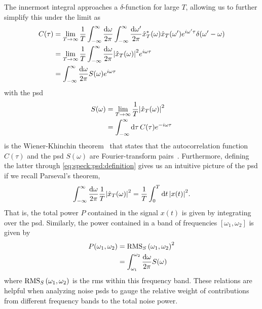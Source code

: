 The innermost integral approaches a $\delta$-function for large $T$, allowing us to further simplify this under the limit as
\begin{align}
    C(\tau) &= \lim_{T\to\infty} \frac{1}{T}\int_{-\infty}^{\infty}\frac{\dd{\omega}}{2\pi}\int_{-\infty}^{\infty}\frac{\dd{\omega^\prime}}{2\pi}
                \hat{x}_T^\ast(\omega)\hat{x}_T(\omega^\prime)
                e^{i\omega^\prime\tau}\delta(\omega^\prime - \omega)\\
            &= \lim_{T\to\infty}\frac{1}{T}
                \int_{-\infty}^{\infty}\frac{\dd{\omega}}{2\pi}\abs{\hat{x}_T(\omega)}^2 e^{i\omega\tau} \\
            &= \int_{-\infty}^{\infty}\frac{\dd{\omega}}{2\pi} S(\omega) e^{i\omega\tau} \label{eq:speck:wiener_khinchin}
\end{align}
with the \acrfull{psd}
\begin{align}
    S(\omega) &= \lim_{T\to\infty}\frac{1}{T}\abs{\hat{x}_T(\omega)}^2 \label{eq:speck:psd:definition}\\
              &= \int_{-\infty}^{\infty}\dd{\tau} C(\tau)e^{-i\omega\tau}
\end{align}
 is the Wiener-Khinchin theorem~\cite{Wiener1930,Khintchine1934} that states that the autocorrelation function $C(\tau)$ and the \gls{psd} $S(\omega)$ are Fourier-transform pairs~\cite{Koopmans1995}.
Furthermore, defining the latter through \cref{eq:speck:psd:definition} gives us an intuitive picture of the \gls{psd} if we recall Parseval's theorem,
\begin{align}\label{eq:speck:parseval}
    \int_{-\infty}^{\infty}\frac{\dd{\omega}}{2\pi}\frac{1}{T}\abs{\hat{x}_T(\omega)}^2 = \frac{1}{T}\int_{0}^{T}\dd{t}\abs{x(t)}^2.
\end{align}
That is, the total power $P$ contained in the signal $x(t)$ is given by integrating over the \gls{psd}.
Similarly, the power contained in a band of frequencies $[\omega_1, \omega_2]$ is given by
\begin{align}
    P(\omega_1, \omega_2) &= \operatorname{RMS}_S\left(\omega_1, \omega_2\right)^2 \label{eq:speck:psd:bandpower}\\
                          &= \int_{\omega_1}^{\omega_2}\frac{\dd{\omega}}{2\pi} S(\omega)
\end{align}
where $\operatorname{RMS}_S\left(\omega_1, \omega_2\right)$ is the \acrlong{rms} within this frequency band.
These relations are helpful when analyzing noise \glspl{psd} to gauge the relative weight of contributions from different frequency bands to the total noise power.

